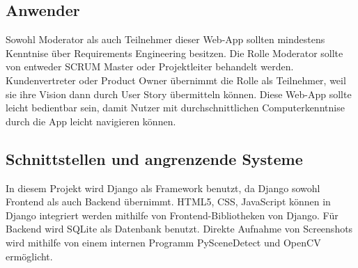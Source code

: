 \subsection{Anwender}
Sowohl Moderator als auch Teilnehmer dieser Web-App sollten mindestens Kenntnise über Requirements Engineering besitzen. Die Rolle Moderator sollte von entweder SCRUM Master 
oder Projektleiter behandelt werden. Kundenvertreter oder Product Owner übernimmt die Rolle als Teilnehmer, weil sie ihre Vision dann durch User Story übermitteln können. 
Diese Web-App sollte leicht bedientbar sein, damit Nutzer mit durchschnittlichen Computerkenntnise durch die App leicht navigieren können.

\subsection{Schnittstellen und angrenzende Systeme} 

In diesem Projekt wird Django als Framework benutzt, da Django sowohl Frontend als auch Backend übernimmt. HTML5, CSS, JavaScript können in Django integriert werden mithilfe 
von Frontend-Bibliotheken von Django. Für Backend wird SQLite als Datenbank benutzt. Direkte Aufnahme von Screenshots wird mithilfe von einem internen Programm PySceneDetect 
und OpenCV ermöglicht.
